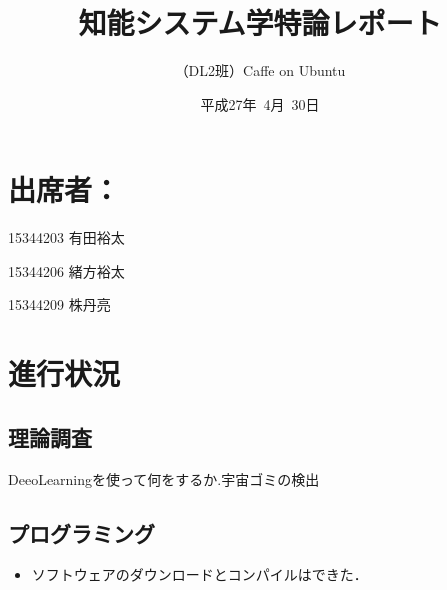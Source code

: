 \documentclass[a4paper,10pt]{jsarticle}
\title{知能システム学特論レポート}
\author{
（DL2班）Caffe on Ubuntu\\
}
\date{平成27年\ 4月\ 30日}
\begin{document}
\maketitle
\section{出席者：}
\begin{list}%
 {} %
 {} %
 \item 15344203 有田裕太
 \item 15344206 緒方裕太
 \item 15344209 株丹亮
\end{list}
\section{進行状況}
\subsection{理論調査}
DeeoLearningを使って何をするか.宇宙ゴミの検出
\subsection{プログラミング}
\begin{itemize}
 \item ソフトウェアのダウンロードとコンパイルはできた．
\end{itemize}
\end{document}
